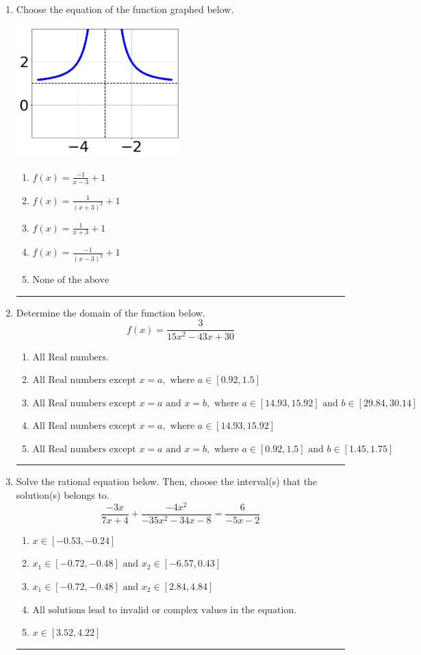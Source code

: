 \documentclass[14pt]{extbook}
\newcommand{\litem}[1]{\item#1\hspace*{-1cm}\rule{\textwidth}{0.4pt}}
\begin{document}
\begin{enumerate}
\litem{
Choose the equation of the function graphed below.
\begin{center}
    \includegraphics[width=0.5\textwidth]{../Figures/rationalGraphToEquationA.png}
\end{center}
\begin{enumerate}[label=\Alph*.]
\item \( f(x) = \frac{-1}{x - 3} + 1 \)
\item \( f(x) = \frac{1}{(x + 3)^2} + 1 \)
\item \( f(x) = \frac{1}{x + 3} + 1 \)
\item \( f(x) = \frac{-1}{(x - 3)^2} + 1 \)
\item \( \text{None of the above} \)

\end{enumerate} }
\litem{
Determine the domain of the function below.\[ f(x) = \frac{3}{15x^{2} -43 x + 30} \]\begin{enumerate}[label=\Alph*.]
\item \( \text{All Real numbers.} \)
\item \( \text{All Real numbers except } x = a, \text{ where } a \in [0.92, 1.5] \)
\item \( \text{All Real numbers except } x = a \text{ and } x = b, \text{ where } a \in [14.93, 15.92] \text{ and } b \in [29.84, 30.14] \)
\item \( \text{All Real numbers except } x = a, \text{ where } a \in [14.93, 15.92] \)
\item \( \text{All Real numbers except } x = a \text{ and } x = b, \text{ where } a \in [0.92, 1.5] \text{ and } b \in [1.45, 1.75] \)

\end{enumerate} }
\litem{
Solve the rational equation below. Then, choose the interval(s) that the solution(s) belongs to.\[ \frac{-3x}{7x + 4} + \frac{-4x^{2}}{-35x^{2} -34 x -8} = \frac{6}{-5x -2} \]\begin{enumerate}[label=\Alph*.]
\item \( x \in [-0.53,-0.24] \)
\item \( x_1 \in [-0.72, -0.48] \text{ and } x_2 \in [-6.57,0.43] \)
\item \( x_1 \in [-0.72, -0.48] \text{ and } x_2 \in [2.84,4.84] \)
\item \( \text{All solutions lead to invalid or complex values in the equation.} \)
\item \( x \in [3.52,4.22] \)


\end{enumerate}}
\end{enumerate}
\end{document}
